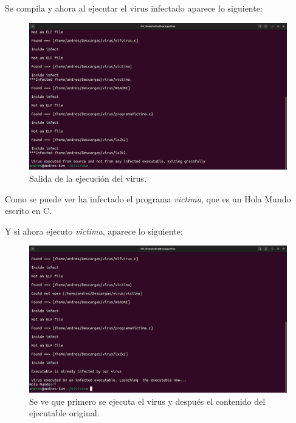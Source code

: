\documentclass{article}
\begin{document}
\bigskip

Se compila y ahora al ejecutar el virus infectado aparece lo siguiente:

\begin{figure}[H]
    \includegraphics[width=\textwidth]{imagenes/Captura desde 2022-11-23 12-32-53.png}
    \caption{Salida de la ejecución del virus.}
\end{figure}

Como se puede ver ha infectado el programa \textit{victima}, que es un Hola Mundo escrito en C.

\newpage

Y si ahora ejecuto \textit{victima}, aparece lo siguiente:

\begin{figure}[H]
    \includegraphics[width=\textwidth]{imagenes/victimaInfectada/Captura desde 2022-11-23 12-33-29.png}
    \caption{Se ve que primero se ejecuta el virus y después el contenido del ejecutable original.}
\end{figure}
\end{document}
